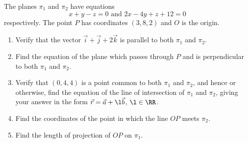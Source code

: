 \begin{problem}
    The planes $\pi_1$ and $\pi_2$ have equations \[x + y - z = 0 \text{ and } 2x-4y+z+12=0\] respectively. The point $P$ has coordinates $(3, 8, 2)$ and $O$ is the origin.

    \begin{enumerate}
        \item Verify that the vector $\vec i + \vec j + 2\vec k$ is parallel to both $\pi_1$ and $\pi_2$.
        \item Find the equation of the plane which passes through $P$ and is perpendicular to both $\pi_1$ and $\pi_2$.
        \item Verify that $(0, 4, 4)$ is a point common to both $\pi_1$ and $\pi_2$, and hence or otherwise, find the equation of the line of intersection of $\pi_1$ and $\pi_2$, giving your answer in the form $\vec r = \vec a + \l \vec b$, $\l \in \RR$.
        \item Find the coordinates of the point in which the line $OP$ meets $\pi_2$.
        \item Find the length of projection of $OP$ on $\pi_1$.
    \end{enumerate}
\end{problem}
